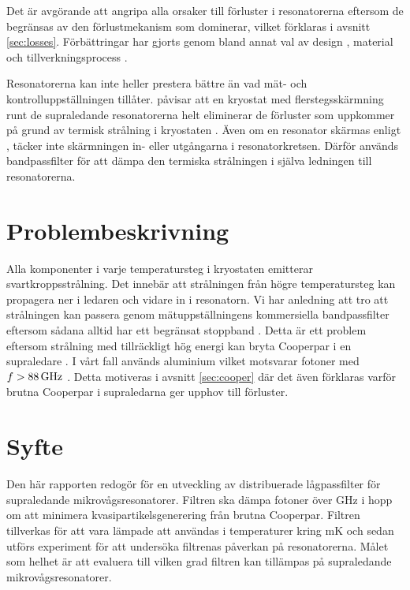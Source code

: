 \documentclass[main.tex]{subfiles}
\begin{document}
Det är avgörande att angripa alla orsaker till förluster i resonatorerna eftersom de begränsas av den förlustmekanism som dominerar, vilket förklaras i avsnitt \ref{sec:losses}. Förbättringar har gjorts genom bland annat val av design \cite{khalil2011,chiaro2016}, material \cite{Goetz2016} och tillverkningsprocess \cite{Bruno2015,Sanberg2012}.

Resonatorerna kan inte heller prestera bättre än vad mät- och kontrolluppställningen tillåter. \citeauthor{Barends2011} påvisar att en kryostat med flerstegsskärmning runt de supraledande resonatorerna helt eliminerar de förluster som uppkommer på grund av termisk strålning i kryostaten \cite{Barends2011}. Även om en resonator skärmas enligt \cite{Barends2011}, täcker inte skärmningen in- eller utgångarna i resonatorkretsen. Därför används bandpassfilter för att dämpa den termiska strålningen i själva ledningen till resonatorerna.

\section{Problembeskrivning}


Alla komponenter i varje temperatursteg i kryostaten emitterar svartkroppsstrålning. Det innebär att strålningen från högre temperatursteg kan propagera ner i ledaren och vidare in i resonatorn. Vi har anledning att tro att strålningen kan passera genom mätuppställningens kommersiella bandpassfilter eftersom sådana alltid har ett begränsat stoppband \cite{santavicca2008}. Detta är ett problem eftersom strålning med tillräckligt hög energi kan bryta Cooperpar i en supraledare \cite{Gao2008}. I vårt fall används aluminium vilket motsvarar fotoner med $f>\unit[88]{GHz}$ \cite{Barends2011}. Detta motiveras i avsnitt \ref{sec:cooper} där det även förklaras varför brutna Cooperpar i supraledarna ger upphov till förluster.

\section{Syfte}
Den här rapporten redogör för en utveckling av distribuerade lågpassfilter för supraledande mikrovågsresonatorer. Filtren ska dämpa fotoner över \unit[88]{GHz} i hopp om att minimera kvasipartikelsgenerering från brutna Cooperpar. Filtren tillverkas för att vara lämpade att användas i temperaturer kring \unit[10]{mK} och sedan utförs experiment för att undersöka filtrenas påverkan på resonatorerna. Målet som helhet är att evaluera till vilken grad filtren kan tillämpas på supraledande mikrovågsresonatorer.
\end{document}
